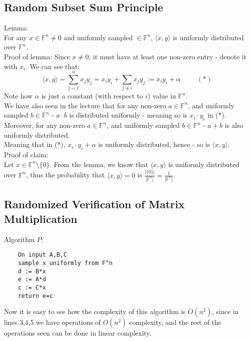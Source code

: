 \documentclass{article}
\begin{document}
\subsection{Random Subset Sum Principle}
Lemma:\\
For any $x\in\mathbb{F}^n\neq 0$ and uniformly sampled $\in\mathbb{F}^n$,
$\langle x,y\rangle$ is uniformly distributed over $\mathbb{F}^n$.\\
Proof of lemma:
Since $x\neq 0$, it must have at least one non-zero entry - denote it with $x_i$.
We can see that:
\[
    \langle x,y\rangle  = \sum_{j=1}^n x_j y_j = x_i y_i + \sum_{j\neq i} x_j y_j := x_iy_i + \alpha \hspace{1cm} (*)
\]
Note how $\alpha$ is just a constant (with respect to $i$) value in $\mathbb{F}^n$.\\
We have also seen in the lecture that for any non-zero $a\in\mathbb{F}^n$,
and uniformly sampled $b\in\mathbb{F}^n$ - $a\cdot b$ is distributed uniformly - meaning so is $x_i\cdot y_i$ in (*).\\
Moreover, for any non-zero $a\in\mathbb{F}^n$,
and uniformly sampled $b\in\mathbb{F}^n$ - $a+b$ is also uniformly distributed.\\
Meaning that in (*), $x_i\cdot y_i + \alpha$ is uniformly distributed, hence - so is $\langle x,y\rangle$.\\

Proof of claim:\\
Let $x\in\mathbb{F}^n\setminus\{0\}$. From the lemma, we know that $\langle x,y\rangle $ is uniformly distributed over $\mathbb{F}^n$,
thus the probability that $\langle x,y\rangle=0$ is $\frac{|\{0\}|}{|\mathbb{F}^n|}=\frac{1}{|\mathbb{F}^n|}$.\\

\subsection{Randomized Verification of Matrix Multiplication}
Algorithm $P$:\\
\begin{lstlisting}
    On input A,B,C
    sample x uniformly from F^n
    d := B*x
    e := A*d
    c := C*x
    return e=c
\end{lstlisting}
Now it is easy to see how the complexity of this algorithm is $O(n^2)$,
since in lines 3,4,5 we have operations of $O(n^2)$ complexity,
and the rest of the operations seen can be done in linear complexity.\\
\end{document}
